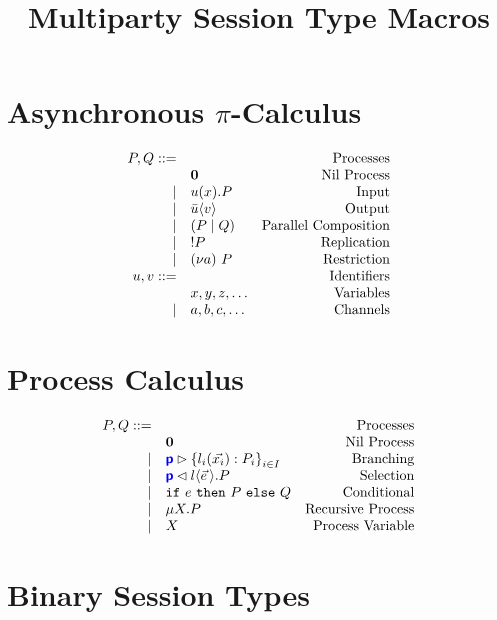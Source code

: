 \documentclass{article}
\title{Multiparty Session Type Macros}
\begin{document}
\maketitle

\section{Asynchronous $\pi$-Calculus}
\doublespacing
\[
\begin{array}{rlr}
    P, Q ::= & & \text{Processes} \\
     & \mathbf{0} & \text{Nil Process} \\
		\mid & {u}({x}).P & \text{Input} \\
		\mid & \bar{u}\langle {v} \rangle & \text{Output} \\
		\mid & \left({P}\mid{Q}\right) & \text{Parallel Composition} \\
		\mid & !{P} & \text{Replication} \\
		\mid & (\nu{a})~{P} & \text{Restriction} \\
    u, v ::= & & \text{Identifiers} \\
     & x, y, z, \dots & \text{Variables} \\
		\mid & a, b, c, \dots & \text{Channels} \\
\end{array}
\]
\singlespacing

\section{Process Calculus}

\doublespacing
\[
\begin{array}{rlr}
    P, Q ::= & & \text{Processes} \\
     & \mathbf{0} & \text{Nil Process} \\
		\mid & {\color{blue}\bm{\mathsf{p}}} \rhd \left\{ {l_i(\vec{x_i}): P_i} \right\}_{i \in I} & \text{Branching} \\
		\mid & {\color{blue}\bm{\mathsf{p}}} \lhd {l \langle \vec{e}\,\rangle. P} & \text{Selection} \\
		\mid & \texttt{if}~{e}~\texttt{then}~{P}~\texttt{else}~{Q} & \text{Conditional} \\
		\mid & \mu X.{P} & \text{Recursive Process} \\
		\mid & X & \text{Process Variable} \\
\end{array}
\]
\singlespacing

\section{Binary Session Types}
\end{document}
